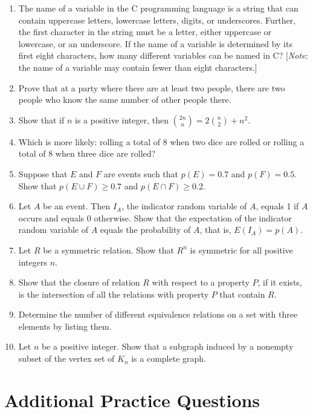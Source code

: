 \documentclass[11pt]{article}
\begin{document}
\begin{enumerate}
    \item  The name of a variable in the C programming language is a string that can contain uppercase letters, lowercase letters, digits, or underscores. Further, the first character in the string must be a letter, either uppercase or lowercase, or an underscore. If the name of a variable is determined by its first eight characters, how many different variables can be named in C? [\textit{Note}: the name of a variable may contain fewer than eight characters.]
    \item  Prove that at a party where there are at least two people, there are two people who know the same number of other people there.
    \item Show that if $n$ is a positive integer, then $\binom{2n}{n} = 2\binom{n}{2} + n^2$.
    \item Which is more likely: rolling a total of 8 when two dice are rolled or rolling a total of 8 when three dice are rolled?
    \item Suppose that $E$ and $F$ are events such that $p(E) = 0.7$ and $p(F) = 0.5$. Show that $p(E \cup F) \geq 0.7$ and $p(E \cap F) \geq 0.2$.
    \item Let $A$ be an event. Then $I_A$, the indicator random variable of $A$, equals 1 if $A$ occurs and equals 0 otherwise. Show that the expectation of the indicator random variable of $A$ equals the probability of $A$, that is, $E(I_A) = p(A)$.
    \item Let $R$ be a symmetric relation. Show that $R^n$ is symmetric for all positive integers $n$.
    \item Show that the closure of relation $R$ with respect to a property $P$, if it exists, is the intersection of all the relations with property $P$ that contain $R$.
    \item Determine the number of different equivalence relations on a set with three elements by listing them.
    \item Let $n$ be a positive integer. Show that a subgraph induced by a nonempty subset of the vertex set of $K_n$ is a complete graph.
\end{enumerate}

\section{Additional Practice Questions}
\end{document}
